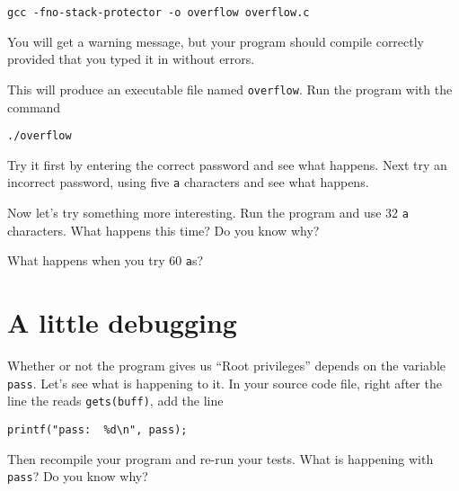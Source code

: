 \documentclass{article}
\begin{document}
\texttt{gcc -fno-stack-protector -o overflow overflow.c}

You will get a warning message, but your program should compile correctly provided that you
typed it in without errors.

This will produce an executable file named \texttt{overflow}.  Run the program with the 
command

\texttt{./overflow}

Try it first by entering the correct password and see what happens.  Next try an incorrect password,
using five \texttt{a} characters and see what happens.

Now let's try something more interesting.  Run the program and use 32 \texttt{a} characters.  What 
happens this time?  Do you know why?

What happens when you try 60 \texttt{a}s?

\section{A little debugging}
Whether or not the program gives us ``Root privileges'' depends on the variable \texttt{pass}.
Let's see what is happening to it.  In your source code file, right after the line the reads
\texttt{gets(buff)}, add the line

\begin{verbatim}
printf("pass:  %d\n", pass);   
\end{verbatim}

Then recompile your program and re-run your tests.  What is happening with \texttt{pass}?
Do you know why?
\end{document}
